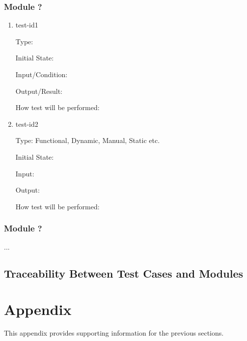 \documentclass[12pt, titlepage]{article}
\renewcommand{\_}{\oldunderscore\allowbreak}
\begin{document}
\subsubsection{Module ?}
		
\begin{enumerate}

\item{test-id1\\}

Type: 
					
Initial State: 
					
Input/Condition: 
					
Output/Result: 
					
How test will be performed: 
					
\item{test-id2\\}

Type: Functional, Dynamic, Manual, Static etc.
					
Initial State: 
					
Input: 
					
Output: 
					
How test will be performed: 

\end{enumerate}

\subsubsection{Module ?}

...

\subsection{Traceability Between Test Cases and Modules}

				




\newpage

\section{Appendix}

This appendix provides supporting information for the previous sections.
\end{document}
